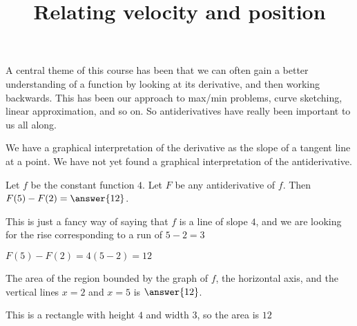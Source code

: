 \documentclass{ximera}
\title[Dig-In:]{Relating velocity and position}
\begin{document}
\begin{abstract}
\end{abstract}
\maketitle

A central theme of this course has been that we can often gain a
better understanding of a function by looking at its derivative, and
then working backwards.  This has been our approach to max/min
problems, curve sketching, linear approximation, and so on.  So
antiderivatives have really been important to us all along.

We have a graphical interpretation of the derivative as the slope of a
tangent line at a point.  We have not yet found a graphical
interpretation of the antiderivative.

  \begin{question}
   Let $f$ be the constant function $4$. Let $F$ be any antiderivative
   of $f$.  Then $F(5)-F(2) = \answer{12}$.
   \begin{hint}
    This is just a fancy way of saying that $f$ is a line of slope
    $4$, and we are looking for the rise corresponding to a run of
    $5-2= 3$
   \end{hint}
   \begin{hint}
    $F(5) - F(2) = 4(5-2) = 12$
   \end{hint}
  \end{question}
  
  \begin{question}
    The area of the region bounded by the graph of $f$, the horizontal
    axis, and the vertical lines $x=2$ and $x=5$ is $\answer{12}$.
    
    \begin{hint}
      \begin{image}
\end{image}
    \end{hint}
    \begin{hint}
      This is a rectangle with height $4$ and width $3$, so the area is $12$
    \end{hint}
  \end{question}
\end{document}

